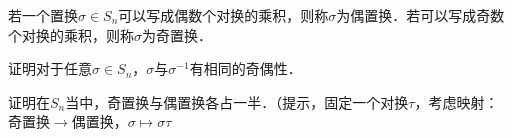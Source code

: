 \begin{definition}{}
若一个置换$\sigma\in S_n$可以写成偶数个对换的乘积，则称$\sigma$为偶置换．若可以写成奇数个对换的乘积，则称$\sigma$为奇置换．
\end{definition}

\begin{exercise}{}
证明对于任意$\sigma\in S_n$，$\sigma$与$\sigma^{-1}$有相同的奇偶性．
\end{exercise}

\begin{exercise}{}
证明在$S_n$当中，奇置换与偶置换各占一半．（提示，固定一个对换$\tau$，考虑映射：奇置换$\to$偶置换，$\sigma\mapsto\sigma\tau$
\end{exercise}

